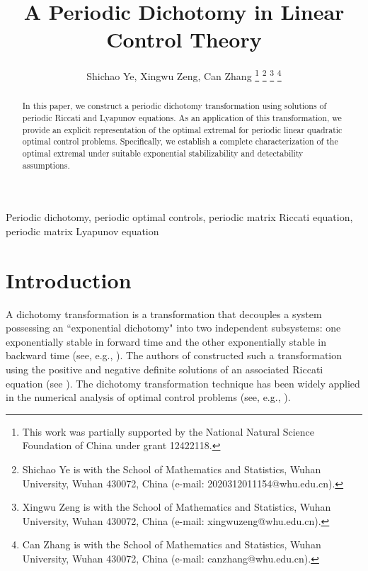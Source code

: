 \documentclass{IEEEtran}
\begin{document}
	\newtheorem{definition}{ Definition}
	\newtheorem{theorem}{ Theorem}
	\newtheorem{lemma}{ Lemma}
	\newtheorem{proposition}{ Proposition}
	\newtheorem{corollary}{ Corollary}
	\newtheorem{remark}{ Remark}
	\title{A Periodic Dichotomy in Linear Control Theory}
	\author{Shichao Ye,  Xingwu Zeng, Can Zhang
		\thanks{This work was partially supported  by the National Natural Science Foundation of China under grant 12422118.}
		\thanks{Shichao Ye is with the School of Mathematics and Statistics, Wuhan University, Wuhan 430072, China (e-mail: 2020312011154@whu.edu.cn).}
		\thanks{Xingwu Zeng is with the School of Mathematics and Statistics, Wuhan University, Wuhan 430072, China (e-mail: xingwuzeng@whu.edu.cn).}
		\thanks{Can Zhang is with the School of Mathematics and Statistics, Wuhan University, Wuhan 430072, China (e-mail: canzhang@whu.edu.cn).}}
	
	
	\maketitle
	
	\begin{abstract}
		In this paper, we construct a periodic dichotomy transformation using solutions of periodic Riccati and Lyapunov equations. 
		As an application of this transformation, we provide an explicit representation of the optimal extremal for periodic linear quadratic optimal control problems.
		Specifically, we establish a complete characterization of the optimal extremal under suitable exponential stabilizability and detectability assumptions.
	\end{abstract}
	
	\begin{IEEEkeywords}
		Periodic dichotomy, periodic optimal controls, periodic matrix Riccati equation, periodic matrix Lyapunov equation
	\end{IEEEkeywords}
	
	\section{Introduction}
	\label{sec:introduction}
	A dichotomy transformation is a transformation that decouples a system possessing an ``exponential dichotomy" into two independent subsystems: one exponentially stable in forward time and the other exponentially stable in backward time (see, e.g., \cite{WK}). 
	The authors of \cite{WK} constructed such a transformation using the positive and negative definite solutions of an associated Riccati equation (see \cite[Lemma 3]{WK}).
	The dichotomy transformation technique has been widely applied in the numerical analysis of optimal control problems (see, e.g., \cite{GG, RM}).
	
\end{document}
